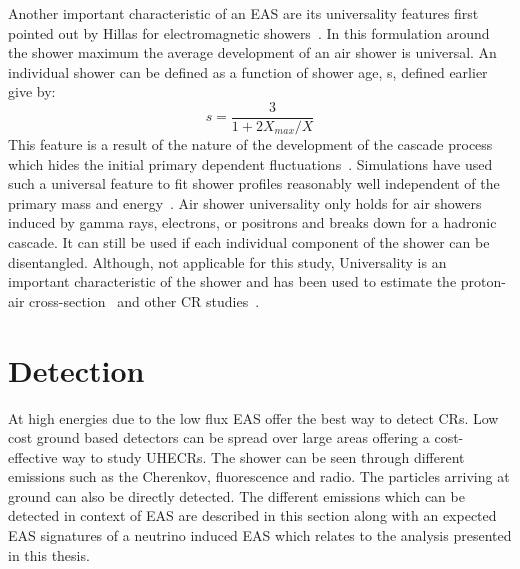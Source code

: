 Another important characteristic of an EAS are its universality features first pointed out by Hillas for electromagnetic showers~\cite{A_M_Hillas_1982}. In this formulation around the shower maximum the average development of an air shower is universal. An individual shower can be defined as a function of shower age, s, defined earlier give by:
\begin{equation}
    s = \frac{3}{1+2 X_{max}/X}
\end{equation}
This feature is a result of the nature of the development of the cascade process which hides the initial primary dependent fluctuations~\cite{Fedosimova:2017vxz}. Simulations have used such a universal feature to fit shower profiles reasonably well independent of the primary mass and energy~\cite{Bridgeman:2017MD}. Air shower universality only holds for air showers induced by gamma rays, electrons, or positrons and breaks down for a hadronic cascade. It can still be used if each individual component of the shower can be disentangled. Although, not applicable for this study, Universality is an important characteristic of the shower and has been used to estimate the proton-air cross-section~\cite{Ulrich_2009} and other CR studies~\cite{cazon2024protonairinteractionsultrahighenergies}.

\section{Detection}
\label{sec:EAS_det}
At high energies due to the low flux EAS offer the best way to detect CRs. Low cost ground based detectors can be spread over large areas offering a cost-effective way to study UHECRs. The shower can be seen through different emissions such as the Cherenkov, fluorescence and radio. The particles arriving at ground can also be directly detected. The different emissions which can be detected in context of EAS are described in this section along with an expected EAS signatures of a neutrino induced EAS which relates to the analysis presented in this thesis.

